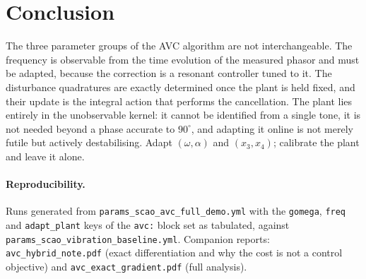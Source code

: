 \documentclass[11pt]{article}
\begin{document}
\section{Conclusion}

The three parameter groups of the AVC algorithm are not interchangeable.
The frequency is observable from the time evolution of the measured phasor
and must be adapted, because the correction is a resonant controller tuned
to it. The disturbance quadratures are exactly determined once the plant is
held fixed, and their update is the integral action that performs the
cancellation. The plant lies entirely in the unobservable kernel: it cannot
be identified from a single tone, it is not needed beyond a phase accurate
to $90^\circ$, and adapting it online is not merely futile but actively
destabilising. Adapt $(\omega,\alpha)$ and $(x_3,x_4)$; calibrate the
plant and leave it alone.

\paragraph{Reproducibility.}
Runs generated from \texttt{params\_scao\_avc\_full\_demo.yml} with the
\texttt{gomega}, \texttt{freq} and \texttt{adapt\_plant} keys of the
\texttt{avc:} block set as tabulated, against
\texttt{params\_scao\_vibration\_baseline.yml}. Companion reports:
\texttt{avc\_hybrid\_note.pdf} (exact differentiation and why the cost is
not a control objective) and \texttt{avc\_exact\_gradient.pdf} (full
analysis).
\end{document}
